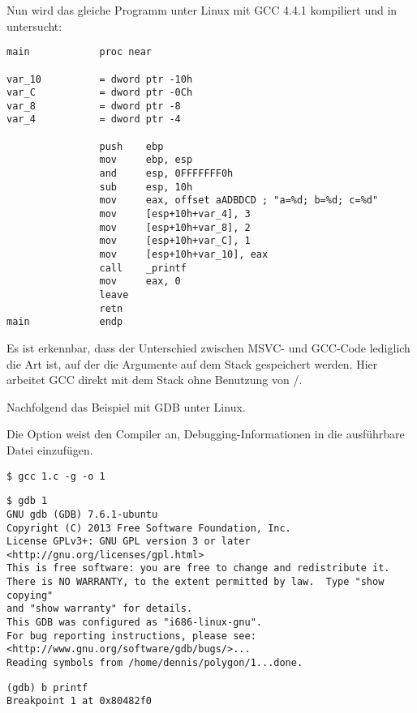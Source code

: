 
Nun wird das gleiche Programm unter Linux mit GCC 4.4.1 kompiliert und in \IDA untersucht:

\begin{lstlisting}
main            proc near

var_10          = dword ptr -10h
var_C           = dword ptr -0Ch
var_8           = dword ptr -8
var_4           = dword ptr -4

                push    ebp
                mov     ebp, esp
                and     esp, 0FFFFFFF0h
                sub     esp, 10h
                mov     eax, offset aADBDCD ; "a=%d; b=%d; c=%d"
                mov     [esp+10h+var_4], 3
                mov     [esp+10h+var_8], 2
                mov     [esp+10h+var_C], 1
                mov     [esp+10h+var_10], eax
                call    _printf
                mov     eax, 0
                leave
                retn
main            endp
\end{lstlisting}

Es ist erkennbar, dass der Unterschied zwischen MSVC- und GCC-Code lediglich die Art ist,
auf der die Argumente auf dem Stack gespeichert werden.
Hier arbeitet GCC direkt mit dem Stack ohne Benutzung von \PUSH/\POP.


Nachfolgend das Beispiel mit \ac{GDB} unter Linux.

Die Option  weist den Compiler an, Debugging-Informationen in die ausführbare Datei einzufügen.

\begin{lstlisting}
$ gcc 1.c -g -o 1
\end{lstlisting}

\begin{lstlisting}
$ gdb 1
GNU gdb (GDB) 7.6.1-ubuntu
Copyright (C) 2013 Free Software Foundation, Inc.
License GPLv3+: GNU GPL version 3 or later <http://gnu.org/licenses/gpl.html>
This is free software: you are free to change and redistribute it.
There is NO WARRANTY, to the extent permitted by law.  Type "show copying"
and "show warranty" for details.
This GDB was configured as "i686-linux-gnu".
For bug reporting instructions, please see:
<http://www.gnu.org/software/gdb/bugs/>...
Reading symbols from /home/dennis/polygon/1...done.
\end{lstlisting}

\begin{lstlisting}[caption=Setzen eines Breakpoints auf \printf]
(gdb) b printf
Breakpoint 1 at 0x80482f0
\end{lstlisting}

